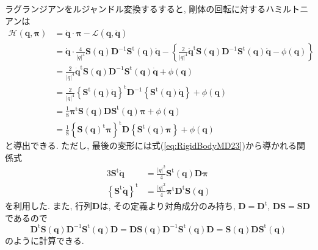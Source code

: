 ラグランジアンをルジャンドル変換するすると, 剛体の回転に対するハミルトニアンは
\begin{align}
 \mathcal{H}(\bm{q},\bm{\pi})
 &=
 \dot{\bm{q}} \cdot \bm{\pi} - \mathcal{L}(\bm{q},\dot{\bm{q}})
 \\
 &=
 \dot{\bm{q}} \cdot
 \frac{4}{|q|^{4}} \bm{S}(\bm{q}) \bm{D}^{-1} \bm{S}^{\mathrm{t}}(\bm{q})
 \dot{\bm{q}}
 - \left\{
 \frac{2}{|q|^{4}} \dot{\bm{q}}^{\mathrm{t}} \bm{S}(\bm{q}) \bm{D}^{-1}
 \bm{S}^{\mathrm{t}}(\bm{q}) \dot{\bm{q}}
 - \phi(\bm{q})
 \right\}
 \\
 &=
 \frac{2}{|q|^{4}} \dot{\bm{q}}^{\mathrm{t}} \bm{S}(\bm{q}) \bm{D}^{-1}
 \bm{S}^{\mathrm{t}}(\bm{q}) \dot{\bm{q}}
 + \phi(\bm{q})
 \\
 &=
 \frac{2}{|q|^{4}} 
 \left\{\bm{S}^{\mathrm{t}}(\bm{q}) \dot{\bm{q}}\right\}^{\mathrm{t}}
 \bm{D}^{-1}
 \left\{\bm{S}^{\mathrm{t}}(\bm{q}) \dot{\bm{q}}\right\}
 + \phi(\bm{q})
 \\
 &=
 \frac{1}{8}
 \bm{\pi}^{\mathrm{t}} \bm{S}(\bm{q}) \bm{D}
 \bm{S}^{\mathrm{t}} (\bm{q}) \bm{\pi}
 + \phi(\bm{q})
 \\
 &=
 \frac{1}{8}
 \left\{\bm{S}(\bm{q})^{\mathrm{t}} \bm{\pi} \right\}^{\mathrm{t}}
 \bm{D}
 \left\{\bm{S}^{\mathrm{t}} (\bm{q}) \bm{\pi}\right\}
 + \phi(\bm{q})
\label{eq:RigidBodyMD24}
\end{align}
と導出できる. ただし, 最後の変形には式(\ref{eq:RigidBodyMD23})から導かれる関係式
\begin{alignat}{3}
  \bm{S}^{\mathrm{t}} \dot{\bm{q}} &=
  \frac{|q|^{2}}{4}
  \bm{S}^{\mathrm{t}}(\bm{q}) \bm{D} \bm{\pi}
  \\
  \left\{\bm{S}^{\mathrm{t}} \dot{\bm{q}}\right\}^{\mathrm{t}} &=
  \frac{|q|^{2}}{4}
  \bm{\pi}^{\mathrm{t}} \bm{D}^{\mathrm{t}} \bm{S} (\bm{q})
\end{alignat}
を利用した. また, 行列$\bm{D}$は, その定義より対角成分のみ持ち, $\bm{D} = \bm{D}^{\mathrm{t}}$, $\bm{D}\bm{S} = \bm{S}\bm{D}$であるので
\begin{equation}
  \bm{D}^{\mathrm{t}} \bm{S} (\bm{q})
  \bm{D}^{-1}
  \bm{S}^{\mathrm{t}}(\bm{q}) \bm{D}
  =
  \bm{D} \bm{S} (\bm{q})
  \bm{D}^{-1}
  \bm{S}^{\mathrm{t}}(\bm{q}) \bm{D}
  =
  \bm{S} (\bm{q}) \bm{D} \bm{S}^{\mathrm{t}}(\bm{q})
\end{equation}
のように計算できる.


